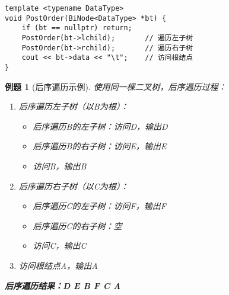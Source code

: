 \documentclass[12pt,a4paper]{amsart}
\newtheorem{example}{例题}[section]
\begin{document}
\begin{lstlisting}[caption=后序遍历递归实现]
template <typename DataType>
void PostOrder(BiNode<DataType> *bt) {
    if (bt == nullptr) return;
    PostOrder(bt->lchild);       // 遍历左子树
    PostOrder(bt->rchild);       // 遍历右子树
    cout << bt->data << "\t";    // 访问根结点
}
\end{lstlisting}
\begin{center}
    \end{center}
\begin{example}[后序遍历示例]
使用同一棵二叉树，后序遍历过程：
\begin{enumerate}
\item 后序遍历左子树（以B为根）：
    \begin{itemize}
    \item 后序遍历B的左子树：访问D，输出D
    \item 后序遍历B的右子树：访问E，输出E
    \item 访问B，输出B
    \end{itemize}
\item 后序遍历右子树（以C为根）：
    \begin{itemize}
    \item 后序遍历C的左子树：访问F，输出F
    \item 后序遍历C的右子树：空
    \item 访问C，输出C
    \end{itemize}
\item 访问根结点A，输出A
\end{enumerate}

\textbf{后序遍历结果：D E B F C A}
\end{example}
\end{document}
